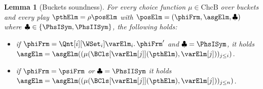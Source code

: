 \documentclass[authoryear]{elsarticle}
\newtheorem{lemma}{Lemma}
\newcommand{\ChoiceFunsBuckets}{\text{ChcB}}
\newcommand{\choiceFunBucket}{\mu}
\begin{document}
\begin{lemma}[Buckets soundness]
  \label{lmm:BucketSoundness}
  For every choice function $\choiceFunBucket \in \ChoiceFunsBuckets$ over
  buckets and every play $\pthElm = \rho\posElm$ with $\posElm = (\phiFrm,
  \asgElm, \clubsuit)$ where $\clubsuit \in \{\PhsISym,\PhsIISym\}$, the
  following holds:
  \begin{itemize}
    \item if $\phiFrm = \Qnt[i][\WSet_i] \varElm_i \ldotp \phiFrm'$ and
      $\clubsuit = \PhsISym$, it holds $\asgElm =
      \asgElm((\choiceFunBucket(\BCls[{\varElm[j]}](\pthElm),\varElm[j]))_{j\leq
        i})$.
    \item if $\phiFrm = \psiFrm$ or $\clubsuit = \PhsIISym$ it holds $\asgElm =
      \asgElm((\choiceFunBucket(\BCls[{\varElm[j]}](\pthElm),\varElm[j]))_{j\leq
        n})$.
  \end{itemize}


\end{lemma}
\end{document}
